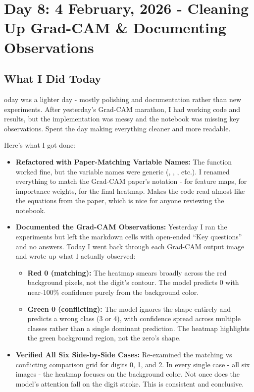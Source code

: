 \documentclass[9pt,a4paper,twocolumn,twoside]{tau-class/tau}
\begin{document}

\section{Day 8: 4 February, 2026 - Cleaning Up Grad-CAM \& Documenting Observations}

    \subsection{What I Did Today}

        oday was a lighter day - mostly polishing and documentation rather than new experiments. After yesterday's Grad-CAM marathon, I had working code and results, but the implementation was messy and the notebook was missing key observations. Spent the day making everything cleaner and more readable.

        Here's what I got done:

        \begin{itemize}
            \item \textbf{Refactored}  \textbf{with Paper-Matching Variable Names:} The function worked fine, but the variable names were generic (, , , etc.). I renamed everything to match the Grad-CAM paper's notation -  for feature maps,  for importance weights,  for the final heatmap. Makes the code read almost like the equations from the paper, which is nice for anyone reviewing the notebook.

            \item \textbf{Documented the Grad-CAM Observations:} Yesterday I ran the experiments but left the markdown cells with open-ended ``Key questions'' and no answers. Today I went back through each Grad-CAM output image and wrote up what I actually observed:
            \begin{itemize}
                \item \textbf{Red 0 (matching):} The heatmap smears broadly across the red background pixels, not the digit's contour. The model predicts 0 with near-100\% confidence purely from the background color.
                \item \textbf{Green 0 (conflicting):} The model ignores the shape entirely and predicts a wrong class (3 or 4), with confidence spread across multiple classes rather than a single dominant prediction. The heatmap highlights the green background region, not the zero's shape.
            \end{itemize}

            \item \textbf{Verified All Six Side-by-Side Cases:} Re-examined the matching vs conflicting comparison grid for digits 0, 1, and 2. In every single case - all six images - the heatmap focuses on the background color. Not once does the model's attention fall on the digit stroke. This is consistent and conclusive.
        \end{itemize}
\end{document}
